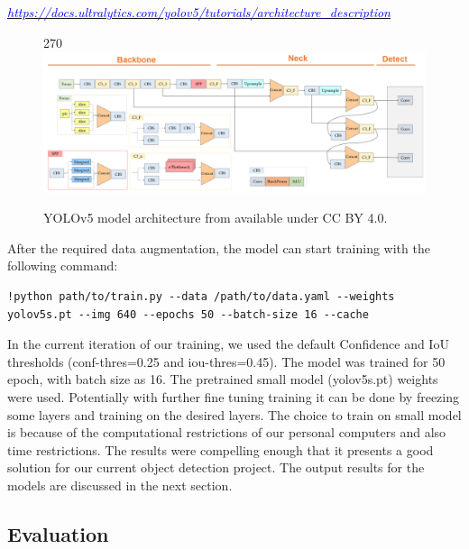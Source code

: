 \documentclass[12pt]{article}
\begin{document}
\href{https://docs.ultralytics.com/yolov5/tutorials/architecture_description}{\textit{\textcolor{blue}{https://docs.ultralytics.com/yolov5/tutorials/architecture\_description}}}

\begin{figure}[p]
    \centering
    \begin{turn}{270}
    \includegraphics[width=1\paperwidth,height=1\paperheight,keepaspectratio]{./graphics/YOLOv5-architecture.png}
    \end{turn}
    \caption{YOLOv5 model architecture from \cite{Kim2021} available under CC BY 4.0.}
    \label{fig:yolov5model}
\end{figure}
\restoregeometry

After the required data augmentation, the model can start training with the following command:

\begin{verbatim}
!python path/to/train.py --data /path/to/data.yaml --weights yolov5s.pt --img 640 --epochs 50 --batch-size 16 --cache
\end{verbatim}
In the current iteration of our training, we used the default Confidence and IoU thresholds (conf-thres=0.25 and iou-thres=0.45). The model was trained for 50 epoch, with batch size as 16. The pretrained small model (yolov5s.pt) weights were used. Potentially with further fine tuning training it can be done by freezing some layers and training on the desired layers. The choice to train on small model is because of the computational restrictions of our personal computers and also time restrictions\cite{YOLOv5GitHub}. The results were compelling enough that it presents a good solution for our current object detection project. The output results for the models are discussed in the next section.

\clearpage
\newpage

\subsection{Evaluation}
\end{document}
